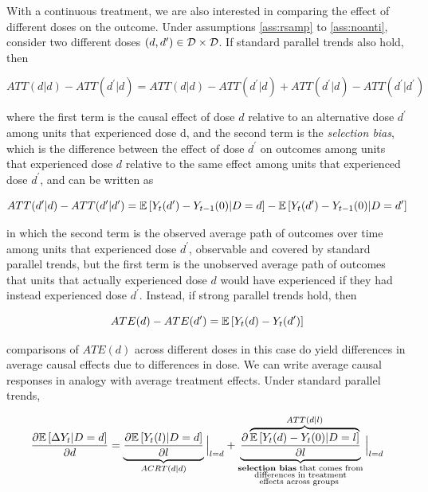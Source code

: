 \documentclass[11pt]{article}
\begin{document}
With a continuous treatment, we are also interested in comparing the effect of different doses on the outcome. Under assumptions \ref{ass:rsamp} to \ref{ass:noanti}, consider two different doses $\left( d,d^{\prime} \right) \in \mathcal{D} \times \mathcal{D}$. If standard parallel trends also hold, then

\begin{equation}
    ATT(d|d) - ATT(d^{\prime}|d) = ATT(d|d) - ATT(d^{\prime}|d) + ATT(d^{\prime}|d) - ATT(d^{\prime}|d^{\prime})
\end{equation}

where the first term is the causal effect of dose $d$ relative to an alternative dose $d^{\prime}$ among units that experienced dose d, and the second term is the \textit{selection bias}, which is the difference between the effect of dose $d^{\prime}$ on outcomes among units that experienced dose $d$ relative to the same effect among units that experienced dose $d^{\prime}$, and can be written as

\begin{equation}
    ATT(d^{\prime}|d) - ATT(d^{\prime}|d^{\prime}) = \mathbb{E}\left[ Y_{t}(d^{\prime}) - Y_{t-1}(0)| D = d \right] - \mathbb{E}\left[ Y_{t}(d^{\prime}) - Y_{t-1}(0) | D = d^{\prime} \right]
\end{equation}

in which the second term is the observed average path of outcomes over time among units that experienced dose $d^{\prime}$, observable and covered by standard parallel trends, but the first term is the unobserved average path of outcomes that units that actually experienced dose $d$ would have experienced if they had instead experienced dose $d^{\prime}$. Instead, if strong parallel trends hold, then

\begin{equation}
    ATE(d) - ATE(d^{\prime}) = \mathbb{E}\left[ Y_{t}(d) - Y_{t}(d^{\prime}) \right]
\end{equation}

comparisons of $ATE(d)$ across different doses in this case do yield differences in average causal effects due to differences in dose. We can write average causal responses in analogy with average treatment effects. Under standard parallel trends, 

\begin{equation}
    \frac{\partial \mathbb{E}\left[ \Delta Y_{t} | D = d \right]}{\partial d} = \underbrace{\frac{\partial \mathbb{E}\left[ Y_{t}(l)|D=d \right]}{\partial l}}_{ACRT(d|d)}\Big\vert_{l=d} + \underbrace{\frac{\partial \overbrace{\mathbb{E}\left[ Y_{t}(d)-Y_{t}(0)|D=l \right]}^{ATT(d|l)}}{\partial l}}_{\substack{\text{\textbf{selection bias} that comes from}\\ \text{differences in treatment}\\ \text{effects across groups }}}\Big\vert_{l=d}
\end{equation}
\end{document}
